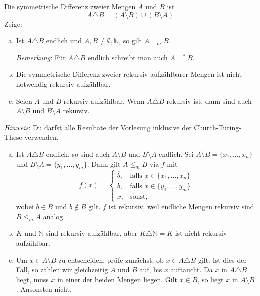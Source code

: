 \documentclass[german,headsepline]{scrartcl}
\theoremstyle{definition}
\begin{document}
	\begin{question}
		Die symmetrische Differenz zweier Mengen $A$ und $B$ ist
		\[A\triangle B=(A\setminus B)\cup(B\setminus A)\]
		Zeige:
		\begin{enumerate}[(a)]
			\item Ist $A\triangle B$ endlich und $A,B\neq\emptyset,\mathbb{N}$, so gilt $A=_mB$.
				
				\textit{Bemerkung}: Für $A\triangle B$ endlich schreibt man auch $A=^*B$.
			\item Die symmetrische Differenz zweier rekursiv aufzählbarer Mengen ist nicht notwendig rekursiv aufzählbar.
			\item Seien $A$ und $B$ rekursiv aufzählbar.
				Wenn $A\triangle B$ rekursiv ist, dann sind auch $A\setminus B$ und $B\setminus A$ rekursiv.
		\end{enumerate}
		\textit{Hinweis}: Du darfst alle Resultate der Vorlesung inklusive der Church-Turing-These verwenden.
	\end{question}
	\begin{solution}
		\begin{enumerate}[(a)]
			\item Ist $A\triangle B$ endlich, so sind auch $A\setminus B$ und $B\setminus A$ endlich.
				Sei $A\setminus B=\{x_1,\dots,x_n\}$ und $B\setminus A=\{y_1,\dots,y_m\}$.
				Dann gilt $A\leq_mB$ via $f$ mit
				\[f(x)=\begin{cases}
					\overline{b}, &\text{falls }x\in\{x_1,\dots,x_n\} \\
					b, &\text{falls }x\in\{y_1,\dots,y_m\} \\
					x, &\text{sonst,}
				\end{cases}\]
				wobei $b\in B$ und $\overline{b}\notin B$ gilt.
				$f$ ist rekursiv, weil endliche Mengen rekursiv sind. $B\leq_mA$ analog.
			\item $K$ und $\mathbb{N}$ sind rekursiv aufzählbar,
				aber $K\triangle\mathbb{N}=\overline{K}$ ist nicht rekursiv aufzählbar.
			\item Um $x\in A\setminus B$ zu entscheiden, prüfe zunächst, ob $x\in A\triangle B$ gilt.
				Ist dies der Fall, so zählen wir gleichzeitig $A$ und $B$ auf, bis $x$ auftaucht.
				Da $x$ in $A\triangle B$ liegt, muss $x$ in einer der beiden Mengen liegen.
				Gilt $x\in B$, so liegt $x$ in $A\setminus B$. Ansonsten nicht.
		\end{enumerate}
	\end{solution}
	
\end{document}
